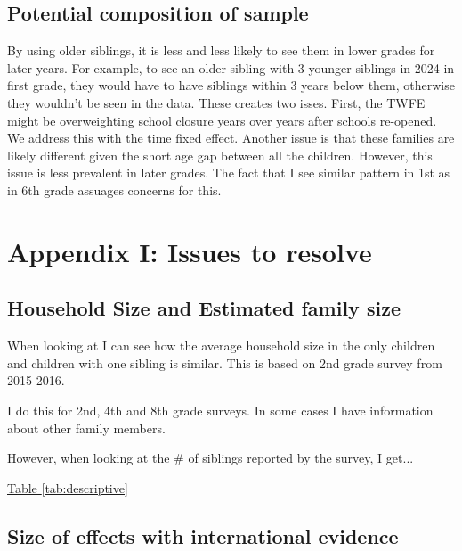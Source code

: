 \subsection{Potential composition of sample}

By using older siblings, it is less and less likely to see them in lower grades for later years. For example, to see an older sibling with 3 younger siblings in 2024 in first grade, they would have to have siblings within 3 years below them, otherwise they wouldn't be seen in the data. These creates two isses. First, the TWFE might be overweighting school closure years over years after schools re-opened. We address this with the time fixed effect. Another issue is that these families are likely different given the short age gap between all the children. However, this issue is less prevalent in later grades. The fact that I see similar pattern in 1st as in 6th grade assuages concerns for this.


\setcounter{figure}{0}
\renewcommand\thefigure{I.\arabic{figure}}    

\setcounter{table}{0}
\renewcommand{\thetable}{I.\arabic{table}}
\setcounter{subsection}{0}

\clearpage

\section*{Appendix I: Issues to resolve} \label{sec:appI}



\subsection{Household Size and Estimated family size}


When looking at  I can see how the average household size in the only children and children with one sibling is similar. This is based on 2nd grade survey from 2015-2016.

I do this for 2nd, 4th and 8th grade surveys. In some cases I have information about other family members.

However, when looking at the \# of siblings reported by the survey, I get...

\hyperref[tab:descriptive]{Table \ref{tab:descriptive}}

\subsection{Size of effects with international evidence}

